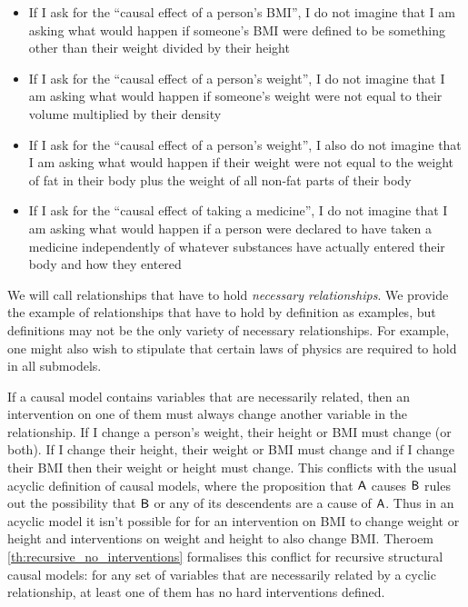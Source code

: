 \begin{itemize}
	\item If I ask for the ``causal effect of a person's BMI'', I do not imagine that I am asking what would happen if someone's BMI were defined to be something other than their weight divided by their height
	\item If I ask for the ``causal effect of a person's weight'', I do not imagine that I am asking what would happen if someone's weight were not equal to their volume multiplied by their density
	\item If I ask for the ``causal effect of a person's weight'', I also do not imagine that I am asking what would happen if their weight were not equal to the weight of fat in their body plus the weight of all non-fat parts of their body
	\item If I ask for the ``causal effect of taking a medicine'', I do not imagine that I am asking what would happen if a person were declared to have taken a medicine independently of whatever substances have actually entered their body and how they entered
\end{itemize}

We will call relationships that have to hold \emph{necessary relationships}. We provide the example of relationships that have to hold by definition as examples, but definitions may not be the only variety of necessary relationships. For example, one might also wish to stipulate that certain laws of physics are required to hold in all submodels.

If a causal model contains variables that are necessarily related, then an intervention on one of them must always change another variable in the relationship. If I change a person's weight, their height or BMI must change (or both). If I change their height, their weight or BMI must change and if I change their BMI then their weight or height must change. This conflicts with the usual acyclic definition of causal models, where the proposition that $\mathsf{A}$ causes $\mathsf{B}$ rules out the possibility that $\mathsf{B}$ or any of its descendents are a cause of $\mathsf{A}$. Thus in an acyclic model it isn't possible for for an intervention on BMI to change weight or height and interventions on weight and height to also change BMI. Theroem \ref{th:recursive_no_interventions} formalises this conflict for recursive structural causal models: for any set of variables that are necessarily related by a cyclic relationship, at least one of them has no hard interventions defined.

